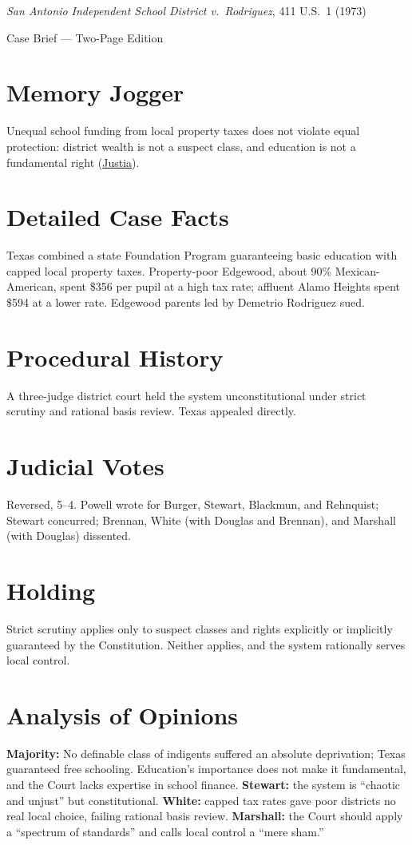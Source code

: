 \documentclass[12pt]{article}
\begin{document}
\begin{center}
{\LARGE \textit{San Antonio Independent School District v.\ Rodriguez}, 411 U.S.\ 1 (1973)\par}
\vspace{0.5em}
{\large Case Brief --- Two-Page Edition\par}
\end{center}

\section{Memory Jogger}
Unequal school funding from local property taxes does not violate equal protection: district wealth is not a suspect class, and education is not a fundamental right (\href{https://supreme.justia.com/cases/federal/us/411/1/}{Justia}).

\section{Detailed Case Facts}
Texas combined a state Foundation Program guaranteeing basic education with capped local property taxes. Property-poor Edgewood, about 90\% Mexican-American, spent \$356 per pupil at a high tax rate; affluent Alamo Heights spent \$594 at a lower rate. Edgewood parents led by Demetrio Rodriguez sued.

\section{Procedural History}
A three-judge district court held the system unconstitutional under strict scrutiny and rational basis review. Texas appealed directly.

\section{Judicial Votes}
Reversed, 5--4. Powell wrote for Burger, Stewart, Blackmun, and Rehnquist; Stewart concurred; Brennan, White (with Douglas and Brennan), and Marshall (with Douglas) dissented.

\section{Holding}
Strict scrutiny applies only to suspect classes and rights explicitly or implicitly guaranteed by the Constitution. Neither applies, and the system rationally serves local control.

\section{Analysis of Opinions}
\textbf{Majority:} No definable class of indigents suffered an absolute deprivation; Texas guaranteed free schooling. Education's importance does not make it fundamental, and the Court lacks expertise in school finance. \textbf{Stewart:} the system is ``chaotic and unjust'' but constitutional. \textbf{White:} capped tax rates gave poor districts no real local choice, failing rational basis review. \textbf{Marshall:} the Court should apply a ``spectrum of standards'' and calls local control a ``mere sham.''
\end{document}
